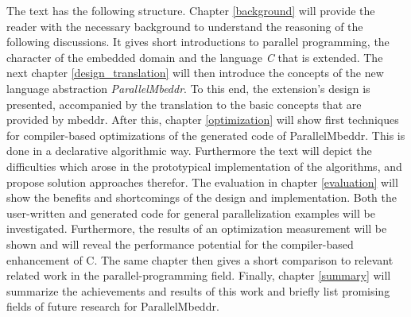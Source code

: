 The text has the following structure. Chapter \ref{background} will provide the reader with the necessary background to understand the reasoning of the following discussions. It gives short introductions to parallel programming, the character of the embedded domain and the language \textit{C} that is extended. The next chapter \ref{design_translation} will then introduce the concepts of the new language abstraction \textit{ParallelMbeddr}. To this end, the extension's design is presented, accompanied by the translation to the basic concepts that are provided by mbeddr. After this, chapter \ref{optimization} will show first techniques for compiler-based optimizations of the generated code of ParallelMbeddr. This is done in a declarative algorithmic way. Furthermore the text will depict the difficulties which arose in the prototypical implementation of the algorithms, and propose solution approaches therefor. The evaluation in chapter \ref{evaluation} will show the benefits and shortcomings of the design and implementation. Both the user-written and generated code for general parallelization examples will be investigated. Furthermore, the results of an optimization measurement will be shown and will reveal the performance potential for the compiler-based enhancement of C. The same chapter then gives a short comparison to relevant related work in the parallel-programming field.
Finally, chapter \ref{summary} will summarize the achievements and results of this work and briefly list promising fields of future research for ParallelMbeddr.
